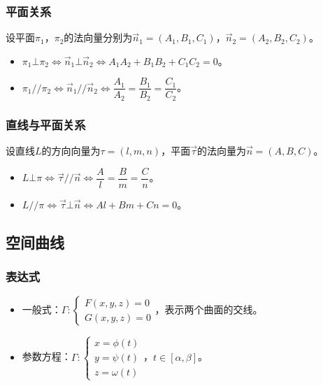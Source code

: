 \documentclass[UTF8, 12pt]{ctexart}
\begin{document}
\subsubsection{平面关系}

设平面$\pi_1$，$\pi_2$的法向量分别为$\vec{n}_1=(A_1,B_1,C_1)$，$\vec{n}_2=(A_2,B_2,C_2)$。

\begin{itemize}
    \item $\pi_1\bot\pi_2\Leftrightarrow\vec{n}_1\bot\vec{n}_2\Leftrightarrow A_1A_2+B_1B_2+C_1C_2=0$。
    \item $\pi_1//\pi_2\Leftrightarrow\vec{n}_1//\vec{n}_2\Leftrightarrow\dfrac{A_1}{A_2}=\dfrac{B_1}{B_2}=\dfrac{C_1}{C_2}$。
\end{itemize}

\subsubsection{直线与平面关系}

设直线$L$的方向向量为$\tau=(l,m,n)$，平面$\vec{\tau}$的法向量为$\vec{n}=(A,B,C)$。

\begin{itemize}
    \item $L\bot\pi\Leftrightarrow\vec{\tau}//\vec{n}\Leftrightarrow\dfrac{A}{l}=\dfrac{B}{m}=\dfrac{C}{n}$。
    \item $L//\pi\Leftrightarrow\vec{\tau}\bot\vec{n}\Leftrightarrow Al+Bm+Cn=0$。
\end{itemize}

\subsection{空间曲线}

\subsubsection{表达式}

\begin{itemize}
    \item 一般式：$\varGamma:\left\{\begin{array}{l}
        F(x,y,z)=0 \\
        G(x,y,z)=0
    \end{array}\right.$，表示两个曲面的交线。
    \item 参数方程：$\varGamma:\left\{\begin{array}{l}
        x=\phi(t) \\
        y=\psi(t) \\
        z=\omega(t)
    \end{array}\right.$，$t\in[\alpha,\beta]$。
\end{itemize}
\end{document}
